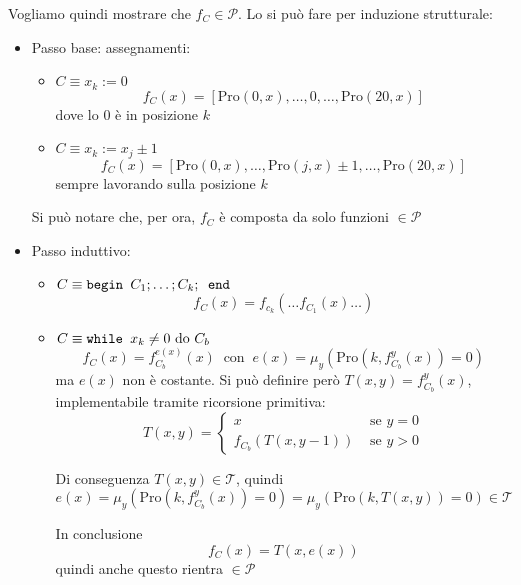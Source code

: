 \documentclass[12pt, answers]{exam}
\theoremstyle{plain}
\newcommand{\cp}{\mathcal{P}}
\newcommand{\T}{\mathcal{T}}
\newcommand{\pro}{\text{Pro}}
\begin{document}
\begin{questions}
\begin{solution}
            Vogliamo quindi mostrare che $f_C \in \cp$. Lo si può fare per induzione strutturale: 
            \begin{itemize}
                \item Passo base: assegnamenti:
                \begin{itemize}
                    \item $C \equiv x_k := 0$
                    $$ f_C (x) = \left[\pro (0, x), \dots, 0, \dots, \pro (20, x) \right] $$
                    dove lo 0 è in posizione $k$
                    
                    \item $C \equiv x_k := x_j \pm 1$
                    $$ f_C (x) = \left[\pro (0, x), \dots, \pro (j, x) \pm 1, \dots, \pro(20, x) \right] $$
                    sempre lavorando sulla posizione $k$
                \end{itemize}
                Si può notare che, per ora, $f_C$ è composta da solo funzioni $\in \cp$
                
                \item Passo induttivo:
                \begin{itemize}
                    \item $C \equiv \text{\texttt{begin }} C_1; \dots; C_k; \text{\texttt{ end}}$
                    $$ f_C (x) = f_{c_k}( \dots f_{C_1}(x) \dots) $$
                    
                    \item $C \equiv \text{\texttt{while }} x_k \neq 0 \text{ do } C_b$
                    $$ f_C (x) = f_{C_b}^{e(x)} (x) \ \text{ con } \ e(x) = \mu_y (\pro (k, f_{C_b}^y (x)) = 0) $$
                    ma $e(x)$ non è costante. Si può definire però $ T(x,y) = f_{C_b}^y (x) $, implementabile tramite ricorsione primitiva:
                    $$ T(x, y) = \begin{cases}
                        x & \text{ se } y = 0 \\
                        f_{C_b} (T (x, y-1)) & \text{ se } y > 0
                    \end{cases}$$
                    
                    Di conseguenza $T(x,y) \in \T$, quindi
                    $$ e(x) = \mu_y (\pro (k, f_{C_b}^y (x)) = 0) = \mu_y (\pro (k, T(x,y)) = 0) \in \T $$
                    
                    In conclusione
                    $$ f_C (x) = T(x, e(x))$$
                    quindi anche questo rientra $\in \cp$
                \end{itemize}
            \end{itemize}
        \end{solution}
        

\end{questions}
\end{document}
